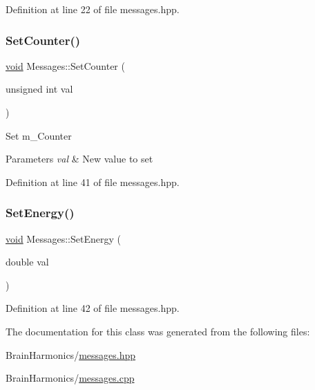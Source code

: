 Definition at line 22 of file messages.\+hpp.

\mbox{\label{class_messages_aecaad70bba58fd8d1a5640cb04088a2c}} 
\subsubsection{\texorpdfstring{Set\+Counter()}{SetCounter()}}
{\footnotesize\ttfamily \mbox{\hyperlink{glad_8h_a950fc91edb4504f62f1c577bf4727c29}{void}} Messages\+::\+Set\+Counter (\begin{DoxyParamCaption}\item[{unsigned int}]{val }\end{DoxyParamCaption})\hspace{0.3cm}{\ttfamily [inline]}}

Set m\+\_\+\+Counter 
\begin{DoxyParams}{Parameters}
{\em val} & New value to set \\
\hline
\end{DoxyParams}


Definition at line 41 of file messages.\+hpp.

\mbox{\label{class_messages_a522996f78812e3a01e68214385db2cfd}} 
\subsubsection{\texorpdfstring{Set\+Energy()}{SetEnergy()}}
{\footnotesize\ttfamily \mbox{\hyperlink{glad_8h_a950fc91edb4504f62f1c577bf4727c29}{void}} Messages\+::\+Set\+Energy (\begin{DoxyParamCaption}\item[{double}]{val }\end{DoxyParamCaption})\hspace{0.3cm}{\ttfamily [inline]}}



Definition at line 42 of file messages.\+hpp.



The documentation for this class was generated from the following files\+:\begin{DoxyCompactItemize}
\item 
Brain\+Harmonics/\mbox{\hyperlink{messages_8hpp}{messages.\+hpp}}\item 
Brain\+Harmonics/\mbox{\hyperlink{messages_8cpp}{messages.\+cpp}}\end{DoxyCompactItemize}
